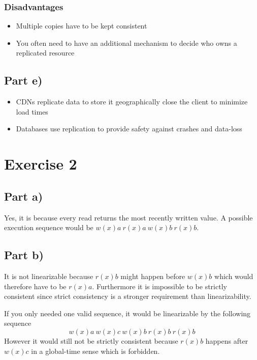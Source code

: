 \documentclass[10pt,a4paper]{article}
\begin{document}
\subsubsection*{Disadvantages}

\begin{itemize}
\item Multiple copies have to be kept consistent
\item You often need to have an additional mechanism to decide who owns a replicated resource
\end{itemize}

\subsection*{Part e)}

\begin{itemize}
\item CDNs replicate data to store it geographically close the client to minimize load times
\item Databases use replication to provide safety against crashes and data-loss
\end{itemize}

\section*{Exercise 2}

\subsection*{Part a)}

Yes, it is because every read returns the most recently written value.
A possible execution sequence would be $w(x)a\ r(x)a\ w(x)b\ r(x)b$.

\subsection*{Part b)}

It is not linearizable because $r(x)b$ might happen before $w(x)b$ which would therefore have to be $r(x)a$.
Furthermore it is impossible to be strictly consistent since strict consistency is a stronger requirement than linearizability.

If you only needed one valid sequence, it would be linearizable by the following sequence
\begin{equation*}
  w(x)a\ w(x)c\ w(x)b\ r(x)b\ r(x)b
\end{equation*}
However it would still not be strictly consistent because $r(x)b$ happens after $w(x)c$ in a global-time sense which is forbidden.
\end{document}

